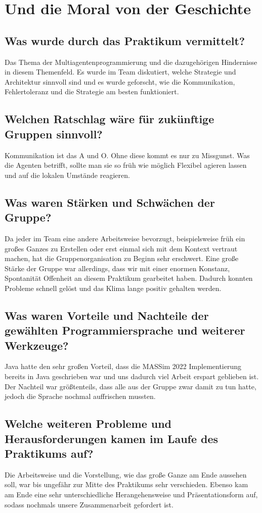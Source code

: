 \section{Und die Moral von der Geschichte}
\subsection{Was wurde durch das Praktikum vermittelt?}
Das Thema der Multiagentenprogrammierung und die dazugehörigen Hindernisse in diesem Themenfeld. Es wurde im Team diskutiert, welche Strategie und Architektur sinnvoll sind und es wurde geforscht, wie die Kommunikation, Fehlertoleranz und die Strategie am besten funktioniert.

\subsection{Welchen Ratschlag wäre für zukünftige Gruppen sinnvoll?}
Kommunikation ist das A und O. Ohne diese kommt es nur zu Missgunst. Was die Agenten betrifft, sollte man sie so früh wie möglich Flexibel agieren lassen und auf die lokalen Umstände reagieren.

\subsection{Was waren Stärken und Schwächen der Gruppe?}
Da jeder im Team eine andere Arbeitsweise bevorzugt, beispielsweise früh ein großes Ganzes zu Erstellen oder erst einmal sich mit dem Kontext vertraut machen, hat die Gruppenorganisation zu Beginn sehr erschwert. Eine große Stärke der Gruppe war allerdings, dass wir mit einer enormen Konstanz, Spontanität Offenheit an diesem Praktikum gearbeitet haben. Dadurch konnten Probleme schnell gelöst und das Klima lange positiv gehalten werden.

\subsection{Was waren Vorteile und Nachteile der gewählten Programmiersprache und weiterer Werkzeuge?}
Java hatte den sehr großen Vorteil, dass die MASSim 2022 Implementierung bereits in Java geschrieben war und uns dadurch viel Arbeit erspart geblieben ist. Der Nachteil war größtenteils, dass alle aus der Gruppe zwar damit zu tun hatte, jedoch die Sprache nochmal auffrischen mussten.

\subsection{Welche weiteren Probleme und Herausforderungen kamen im Laufe des Praktikums auf?}
Die Arbeitsweise und die Vorstellung, wie das große Ganze am Ende aussehen soll, war bis ungefähr zur Mitte des Praktikums sehr verschieden. Ebenso kam am Ende eine sehr unterschiedliche Herangehensweise und Präsentationsform auf, sodass nochmals unsere Zusammenarbeit gefordert ist.

